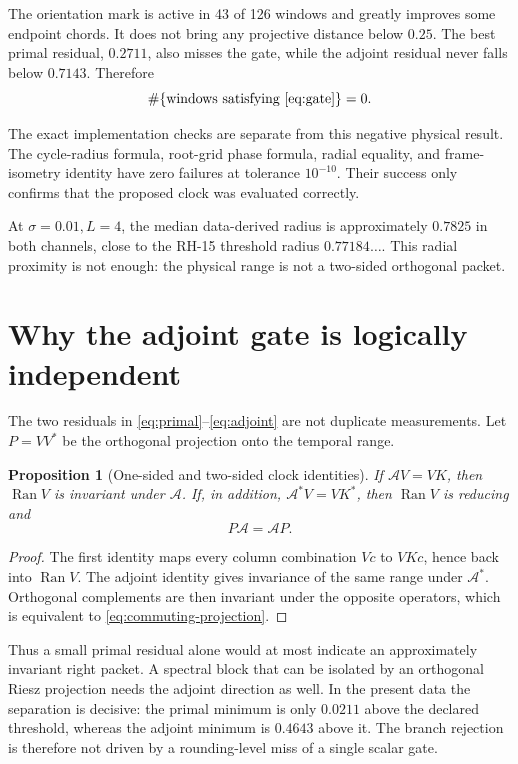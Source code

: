 \documentclass[12pt]{article}
\newtheorem{proposition}[theorem]{Proposition}
\theoremstyle{remark}
\begin{document}
The orientation mark is active in 43 of 126 windows and greatly improves
some endpoint chords.  It does not bring any projective distance below
$0.25$.  The best primal residual, $0.2711$, also misses the gate, while the
adjoint residual never falls below $0.7143$.  Therefore
\begin{equation}\label{eq:zero-success}
 \#\{\text{windows satisfying \eqref{eq:gate}}\}=0.
\end{equation}

The exact implementation checks are separate from this negative physical
result.  The cycle-radius formula, root-grid phase formula, radial equality,
and frame-isometry identity have zero failures at tolerance $10^{-10}$.
Their success only confirms that the proposed clock was evaluated correctly.

At $\sigma=0.01,L=4$, the median data-derived radius is approximately
$0.7825$ in both channels, close to the RH-15 threshold radius
$0.77184\ldots$.  This radial proximity is not enough: the physical range is
not a two-sided orthogonal packet.

\section{Why the adjoint gate is logically independent}

The two residuals in \eqref{eq:primal}--\eqref{eq:adjoint} are not duplicate
measurements.  Let $P=VV^*$ be the orthogonal projection onto the temporal
range.

\begin{proposition}[One-sided and two-sided clock identities]
If $\mathcal AV=VK$, then $\operatorname{Ran}V$ is invariant under
$\mathcal A$.  If, in addition, $\mathcal A^*V=VK^*$, then
$\operatorname{Ran}V$ is reducing and
\begin{equation}\label{eq:commuting-projection}
 P\mathcal A=\mathcal AP.
\end{equation}
\end{proposition}

\begin{proof}
The first identity maps every column combination $Vc$ to $VKc$, hence back
into $\operatorname{Ran}V$.  The adjoint identity gives invariance of the
same range under $\mathcal A^*$.  Orthogonal complements are then invariant
under the opposite operators, which is equivalent to
\eqref{eq:commuting-projection}.
\end{proof}

Thus a small primal residual alone would at most indicate an approximately
invariant right packet.  A spectral block that can be isolated by an
orthogonal Riesz projection needs the adjoint direction as well.  In the
present data the separation is decisive: the primal minimum is only
$0.0211$ above the declared threshold, whereas the adjoint minimum is
$0.4643$ above it.  The branch rejection is therefore not driven by a
rounding-level miss of a single scalar gate.
\end{document}
